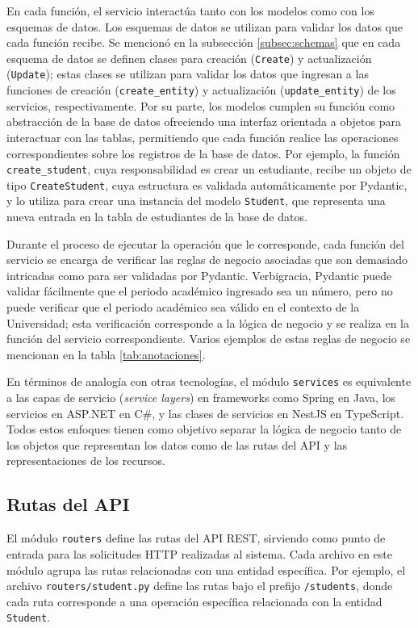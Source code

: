 En cada función, el servicio interactúa tanto con los modelos como con los esquemas de datos. Los esquemas de datos se utilizan para validar los datos que cada función recibe. Se mencionó en la subsección \ref{subsec:schemas} que en cada esquema de datos se definen clases para creación (\texttt{Create}) y actualización (\texttt{Update}); estas clases se utilizan para validar los datos que ingresan a las funciones de creación (\texttt{create\_entity}) y actualización (\texttt{update\_entity}) de los servicios, respectivamente. Por su parte, los modelos cumplen su función como abstracción de la base de datos ofreciendo una interfaz orientada a objetos para interactuar con las tablas, permitiendo que cada función realice las operaciones correspondientes sobre los registros de la base de datos. Por ejemplo, la función \texttt{create\_student}, cuya responsabilidad es crear un estudiante, recibe un objeto de tipo \texttt{CreateStudent}, cuya estructura es validada automáticamente por \gls{Pydantic}, y lo utiliza para crear una instancia del modelo \texttt{Student}, que representa una nueva entrada en la tabla de estudiantes de la base de datos.

Durante el proceso de ejecutar la operación que le corresponde, cada función del servicio se encarga de verificar las reglas de negocio asociadas que son demasiado intricadas como para ser validadas por \gls{Pydantic}. Verbigracia, \gls{Pydantic} puede validar fácilmente que el periodo académico ingresado sea un número, pero no puede verificar que el periodo académico sea válido en el contexto de la Universidad; esta verificación corresponde a la lógica de negocio y se realiza en la función del servicio correspondiente. Varios ejemplos de estas reglas de negocio se mencionan en la tabla \ref{tab:anotaciones}.

En términos de analogía con otras tecnologías, el módulo \texttt{services} es equivalente a las capas de servicio (\textit{service layers}) en frameworks como Spring en Java, los servicios en ASP.NET en C\#, y las clases de servicios en NestJS en TypeScript. Todos estos enfoques tienen como objetivo separar la lógica de negocio tanto de los objetos que representan los datos como de las rutas del API y las representaciones de los recursos.

\subsection{Rutas del API}

El módulo \texttt{routers} define las rutas del \gls{API REST}, sirviendo como punto de entrada para las solicitudes \gls{HTTP} realizadas al sistema. Cada archivo en este módulo agrupa las rutas relacionadas con una entidad específica. Por ejemplo, el archivo \texttt{routers/student.py} define las rutas bajo el prefijo \texttt{/students}, donde cada ruta corresponde a una operación específica relacionada con la entidad \texttt{Student}.

